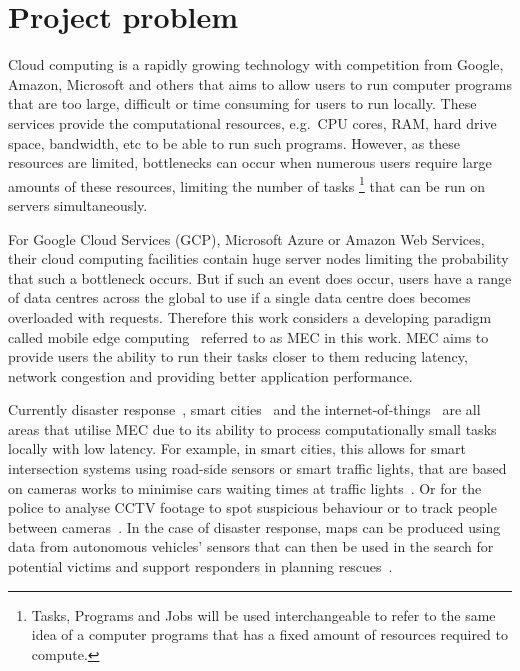 \chapter{Project problem}\label{ch:project-problem}
Cloud computing is a rapidly growing technology with competition from Google, Amazon, Microsoft and others that aims to
allow users to run computer programs that are too large, difficult or time consuming for users to run locally.
These services provide the computational resources, e.g.\ CPU cores, RAM, hard drive space, bandwidth, etc
to be able to run such programs. However, as these resources are limited, bottlenecks can occur when
numerous users require large amounts of these resources, limiting the number of tasks
\footnote{Tasks, Programs and Jobs will be used interchangeable to refer to the same idea of a computer programs that
has a fixed amount of resources required to compute.} that can be run on servers simultaneously.

For Google Cloud Services (GCP), Microsoft Azure or Amazon Web Services, their cloud computing facilities contain huge
server nodes limiting the probability that such a bottleneck occurs. But if such an event does occur, users
have a range of data centres across the global to use if a single data centre does becomes overloaded with requests.
Therefore this work considers a developing paradigm~\citep{mobile_edge_survey} called mobile edge
computing~\citep{hu2015mobile} referred to as MEC in this work. MEC aims to provide users the ability to run their
tasks closer to them reducing latency, network congestion and providing better application performance.

Currently disaster response~\citep{mobile_edge_disaster}, smart cities~\citep{smart_disaster_management} and the
internet-of-things~\citep{mobile_edge_IoT} are all areas that utilise MEC due to its ability
to process computationally small tasks locally with low latency. For example, in smart cities, this
allows for smart intersection systems using road-side sensors or smart traffic lights, that are based
on cameras works to minimise cars waiting times at traffic lights~\citep{smart_cities_traffic_lights}. Or for the
police to analyse CCTV footage to spot suspicious behaviour or to track people between cameras~\citep{Sreenu2019}.
In the case of disaster response, maps can be produced using data from autonomous vehicles' sensors that can then be
used in the search for potential victims and support responders in planning rescues~\citep{smart_disaster_management}.


